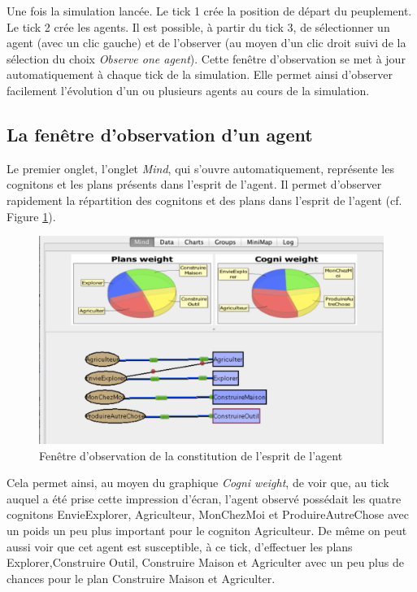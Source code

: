 Une fois la simulation lancée. Le tick 1 crée la position de départ du peuplement. Le tick 2 crée les agents. Il est possible, à partir du tick 3, de sélectionner un agent (avec un clic gauche) et de l'observer (au moyen d'un clic droit suivi de la sélection du choix \textit{Observe one agent}). Cette fenêtre d'observation se met à jour automatiquement à chaque tick de la simulation. Elle permet ainsi d'observer facilement l'évolution d'un ou plusieurs agents au cours de la simulation.

\subsection{La fenêtre d'observation d'un agent}

Le premier onglet, l'onglet \textit{Mind}, qui s'ouvre automatiquement, représente les cognitons et les plans présents dans l'esprit de l'agent. Il permet d'observer rapidement la répartition des cognitons et des plans dans l'esprit de l'agent (cf. Figure \ref{observe}).

\begin{figure}[!ht]
\begin{center}
\includegraphics[scale=0.5]{DocumentationSimulation/observe.pdf}
\caption[observe]{Fenêtre d'observation de la constitution de l'esprit de l'agent \\}
\label{observe}
\end{center}
\end{figure} 

Cela permet ainsi, au moyen du graphique \textit{Cogni weight}, de voir que, au tick auquel a été prise cette impression d'écran, l'agent observé possédait les quatre cognitons EnvieExplorer, Agriculteur, MonChezMoi et ProduireAutreChose avec un poids un peu plus important pour le cogniton Agriculteur. De même on peut aussi voir que cet agent est susceptible, à ce tick, d'effectuer les plans Explorer,Construire Outil, Construire Maison et Agriculter avec un peu plus de chances pour le plan Construire Maison et Agriculter. 


